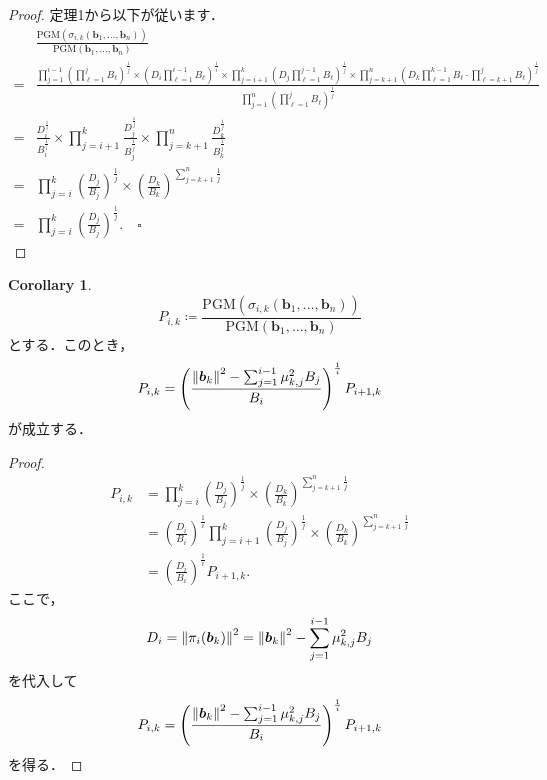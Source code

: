 \documentclass[a4j, dvipdfmx]{jsarticle}
\theoremstyle{definition}
\newtheorem{corollary}[definition]{Corollary}
\begin{document}
\begin{proof}
定理1から以下が従います．
\begin{align*}
&\frac{\mathrm{PGM}(\sigma_{i, k}(\boldsymbol{b}_1,\ldots,\boldsymbol{b}_n))}{\mathrm{PGM}(\boldsymbol{b}_1,\ldots,\boldsymbol{b}_n)}\\
=&\frac{\displaystyle \prod_{j=1}^{i-1}\left(\prod_{\ell=1}^j B_\ell\right)^\frac{1}{j}\times \left(D_i\prod_{\ell=1}^{i-1}B_\ell\right)^\frac{1}{i}\times \prod_{j=i+1}^k\left(D_j\prod_{\ell=1}^{j-1}B_\ell\right)^\frac{1}{j}\times \prod_{j=k+1}^n \left(D_k\prod_{\ell=1}^{k-1}B_\ell\cdot \prod_{\ell=k+1}^j B_\ell\right)^\frac{1}{j}}{\displaystyle \prod_{j=1}^n\left( \prod_{\ell=1}^{j}B_\ell\right)^\frac{1}{j}}\\
=&\frac{D_i^\frac{1}{i}}{B_i^\frac{1}{i}}\times \prod_{j=i+1}^k \frac{D_j^\frac{1}{j}}{B_j^\frac{1}{j}}\times \prod_{j=k+1}^n\frac{D_k^\frac{1}{j}}{B_k^\frac{1}{j}}\\
=&\prod_{j=i}^k \left(\frac{D_j}{B_j}\right)^\frac{1}{j}\times \left(\frac{D_k}{B_k}\right)^{\sum_{j=k+1}^n\frac{1}{j}}\\
=&\prod_{j=i}^k \left(\frac{D_j}{B_j}\right)^\frac{1}{j}.\quad \square
\end{align*}
\end{proof}

\begin{corollary}
    $$
    P_{i, k}\coloneqq \frac{\mathrm{PGM}(\sigma_{i, k}(\boldsymbol{b}_1,\ldots,\boldsymbol{b}_n))}{\mathrm{PGM}(\boldsymbol{b}_1,\ldots,\boldsymbol{b}_n)}
    $$
    とする．このとき，
    $$
    P_{i, k}=\left(\frac{\norm{\boldsymbol{b}_k}^2-\sum_{j=1}^{i-1}\mu_{k, j}^2B_j}{B_i}\right)^\frac{1}{i}P_{i+1, k}
    $$
    が成立する．
\end{corollary}

\begin{proof}
    $$
    \begin{aligned}
    P_{i, k}&=\prod_{j=i}^k \left(\frac{D_j}{B_j}\right)^\frac{1}{j}\times \left(\frac{D_k}{B_k}\right)^{\sum_{j=k+1}^n\frac{1}{j}}\\
    &=\left(\frac{D_i}{B_i}\right)^\frac{1}{i}\prod_{j=i+1}^k \left(\frac{D_j}{B_j}\right)^\frac{1}{j}\times \left(\frac{D_k}{B_k}\right)^{\sum_{j=k+1}^n\frac{1}{j}}\\
    &=\left(\frac{D_i}{B_i}\right)^\frac{1}{i}P_{i+1, k}.
    \end{aligned}
    $$
    ここで，
    $$
    D_i=\norm{\pi_i(\boldsymbol{b}_k)}^2=\norm{\boldsymbol{b}_k}^2-\sum_{j=1}^{i-1}\mu_{k, j}^2B_j
    $$
    を代入して
    $$
    P_{i, k}=\left(\frac{\norm{\boldsymbol{b}_k}^2-\sum_{j=1}^{i-1}\mu_{k, j}^2B_j}{B_i}\right)^\frac{1}{i}P_{i+1, k}
    $$
    を得る．
\end{proof}
\end{document}
